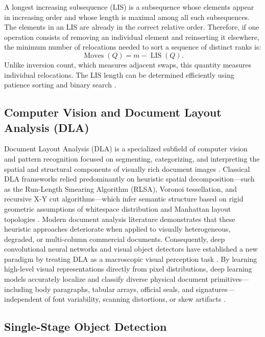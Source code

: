 A longest increasing subsequence (LIS) is a subsequence whose elements appear in increasing order and whose length is maximal among all such subsequences.
The elements in an LIS are already in the correct relative order.
Therefore, if one operation consists of removing an individual element and reinserting it elsewhere, the minimum number of relocations needed to sort a sequence of distinct ranks is:
\begin{equation}
\label{eq:theory_sequence_moves}
\operatorname{Moves}(Q) = m - \operatorname{LIS}(Q).
\end{equation}
Unlike inversion count, which measures adjacent swaps, this quantity measures individual relocations.
The LIS length can be determined efficiently using patience sorting and binary search \cite{docxa7}.

\subsection{Computer Vision and Document Layout Analysis (DLA)}

Document Layout Analysis (DLA) is a specialized subfield of computer vision and pattern recognition focused on segmenting, categorizing, and interpreting the spatial and structural components of visually rich document images \cite{ref27}.
Classical DLA frameworks relied predominantly on heuristic spatial decomposition—such as the Run-Length Smearing Algorithm (RLSA), Voronoi tessellation, and recursive X-Y cut algorithms—which infer semantic structure based on rigid geometric assumptions of whitespace distribution and Manhattan layout topologies \cite{ref27}.
Modern document analysis literature demonstrates that these heuristic approaches deteriorate when applied to visually heterogeneous, degraded, or multi-column commercial documents.
Consequently, deep convolutional neural networks and visual object detectors have established a new paradigm by treating DLA as a macroscopic visual perception task \cite{ref9}.
By learning high-level visual representations directly from pixel distributions, deep learning models accurately localize and classify diverse physical document primitives—including body paragraphs, tabular arrays, official seals, and signatures—independent of font variability, scanning distortions, or skew artifacts \cite{ref27, ref9}.

\subsection{Single-Stage Object Detection}

